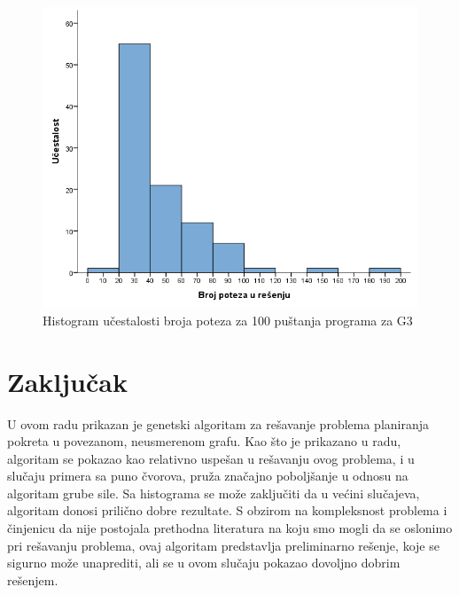 \documentclass[12pt]{article}
\begin{document}
	\begin{figure}[H]
	\begin{center}
		\includegraphics[scale=0.4]{brojpoteza1.png}
	\end{center}
	\caption{{\small Histogram učestalosti broja poteza za 100 puštanja programa za G3}}
	\label{fig:slika7}
\end{figure}

\vspace*{2\baselineskip}

	\section{Zaključak}
	\label{sec:zakljucak}
	
	U ovom radu prikazan je genetski algoritam za rešavanje problema planiranja pokreta u povezanom, neusmerenom grafu. Kao što je prikazano u radu, algoritam se pokazao kao relativno uspešan u rešavanju ovog problema, i u slučaju primera sa puno čvorova, pruža značajno poboljšanje u odnosu na algoritam grube sile. Sa histograma se može zaključiti da u većini slučajeva, algoritam donosi prilično dobre rezultate. S obzirom na kompleksnost problema i činjenicu da nije postojala prethodna literatura na koju smo mogli da se oslonimo pri rešavanju problema, ovaj algoritam predstavlja preliminarno rešenje, koje se sigurno može unaprediti, ali se u ovom slučaju pokazao dovoljno dobrim rešenjem.
	
	\newpage
	
	 
	
	
\end{document}
